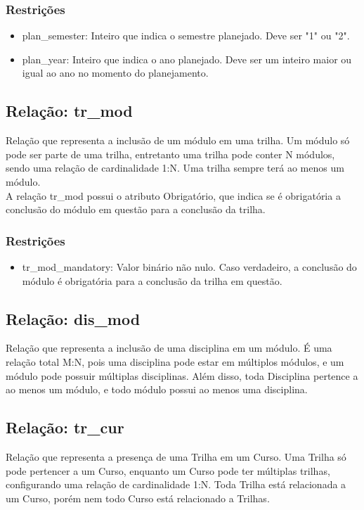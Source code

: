 \documentclass{article}
\begin{document}
        \subsubsection{Restrições}
            \begin{itemize}
                \item plan\_semester: Inteiro que indica o semestre planejado. Deve ser "1" ou "2".
                \item plan\_year: Inteiro que indica o ano planejado. Deve ser um inteiro maior ou igual ao ano no momento do planejamento.
            \end{itemize}
    
    \subsection{Relação: tr\_mod}
        \quad Relação que representa a inclusão de um módulo em uma trilha. Um módulo só pode ser parte de uma trilha, entretanto uma trilha pode conter N módulos, sendo uma relação de cardinalidade 1:N. Uma trilha sempre terá ao menos um módulo. \\
        \quad A relação tr\_mod possui o atributo Obrigatório, que indica se é obrigatória a conclusão do módulo em questão para a conclusão da trilha.
        \subsubsection{Restrições}
            \begin{itemize}
                \item tr\_mod\_mandatory: Valor binário não nulo. Caso verdadeiro, a conclusão do módulo é obrigatória para a conclusão da trilha em questão.
          \end{itemize}
       
    \subsection{Relação: dis\_mod}
        \quad Relação que representa a inclusão de uma disciplina em um módulo. É uma relação total M:N, pois uma disciplina pode estar em múltiplos módulos, e um módulo pode possuir múltiplas disciplinas. Além disso, toda Disciplina pertence a ao menos um módulo, e todo módulo possui ao menos uma disciplina.
    
    \subsection{Relação: tr\_cur}
        \quad Relação que representa a presença de uma Trilha em um Curso. Uma Trilha só pode pertencer a um Curso, enquanto um Curso pode ter múltiplas trilhas, configurando uma relação de cardinalidade 1:N. Toda Trilha está relacionada a um Curso, porém nem todo Curso está relacionado a Trilhas.
\end{document}
